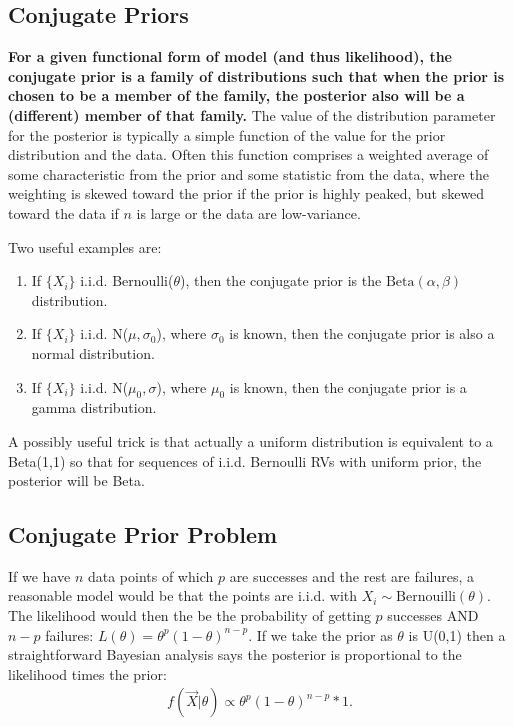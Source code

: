 \subsection{Conjugate Priors}
\textbf{For a given functional form of model (and thus likelihood), the conjugate prior is a family of distributions such that when the prior is chosen to be a member of the family, the posterior also will be a (different) member of that family.} The value of the distribution parameter for the posterior is typically a simple function of the value for the prior distribution and the data. Often this function comprises a weighted average of some characteristic from the prior and some statistic from the data, where the weighting is skewed toward the prior if the prior is highly peaked, but skewed toward the data if $n$ is large or the data are low-variance.
\n

Two useful examples are:
\begin{enumerate}
\item If $\{X_i\}$ i.i.d. Bernoulli($\theta$), then the conjugate prior is the $\mathrm{Beta}(\alpha, \beta)$ distribution.
\item If $\{X_i\}$ i.i.d. N($\mu, \sigma_0$), where $\sigma_0$ is known, then the conjugate prior is also a normal distribution.
\item If $\{X_i\}$ i.i.d. N($\mu_0, \sigma$), where $\mu_0$ is known, then the conjugate prior is a gamma distribution.
\end{enumerate}

A possibly useful trick is that actually a uniform distribution is equivalent to a Beta(1,1) so that for sequences of i.i.d. Bernoulli RVs with uniform prior, the posterior will be Beta. 

\subsection{Conjugate Prior Problem}
If we have $n$ data points of which $p$ are successes and the rest are failures, a reasonable model would be that the points are i.i.d. with $X_i \sim \mathrm{Bernouilli}(\theta)$. The likelihood would then the be the probability of getting $p$ successes AND $n-p$ failures: $L(\theta) = \theta^p (1-\theta)^{n-p}$. If we take the prior as $\theta$ is U(0,1) then a straightforward Bayesian analysis says the posterior is proportional to the likelihood times the prior:
\begin{align*}
f(\vec{X} | \theta) \propto \theta^p (1-\theta)^{n-p} * 1.
\end{align*}

